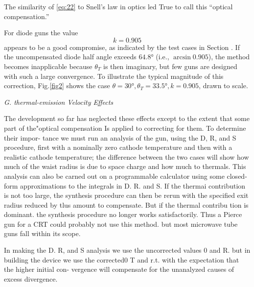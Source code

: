 \documentclass[10pt,a4paper,UTF8,fleqn]{article}
\begin{document}
The similarity of \eqref{eq:22} to Snell's law in optics led True to call this ``optical compensation.''

For diode guns the value
\begin{equation} \label{eq:24}
	k = 0.905
\end{equation}
appears to be a good compromise, as indicated by the test cases in Section \uppercase\expandafter{}. If the uncompensated diode half angle exceeds $ \ang{64.8} $ (i.e., $ \arcsin0.905 $), the method becomes inapplicable because $ \theta_T $ is then imaginary, but few guns are designed with such a large convergence. To illustrate the typical magnitude of this correction, Fig.\ref{fig2} shows the case $ \theta = \ang{30}, \theta_T = \ang{33.5}, k = 0.905$, drawn to scale.

\vspace{2ex}\textit{G. thermal-emission Velocity Effects}\vspace{0.5ex}

The development so far has neglected these effects except to the extent that some part of the"optical compensation Is applied to correcting for them. To determine their impor- tance we must run an analysis of the gun, using the D, R, and S procedure, first with a nominally zero cathode temperature and then with a realistic cathode temperature; the difference between the two cases will show how much of the waist radius is due to space charge and how much to thermals. This analysis can also be carned out on a programmable calculator using some closed-form approximations to the integrals in D. R. and S. If the thermai contribution is not too large, the synthesis procedure can then be rerun with the specified exit radius reduced by tlus amount to compensate. But if the thermal contribu tion is dominant. the synthesis procedure no longer works satisfactorily. Thus a Pierce gun for a CRT could probably not use this method. but most microwave tube guns fall within its scope.


In making the D. R, and S analysis we use the uncorrected values 0 and R. but in building the device we use the corrected0
T and r.t. with the expectation that the higher initial con- vergence will compensate for the unanalyzed causes of excess divergence.
\end{document}
